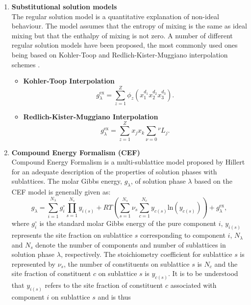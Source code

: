 	\begin{enumerate}
	\item \textbf{Substitutional solution models}\\
	The regular solution model is a quantitative explanation of non-ideal behaviour. The model assumes that the entropy of mixing is the same as ideal mixing but that the enthalpy of mixing is not zero. A number of different regular solution models have been proposed, the most commonly used ones being based on Kohler-Toop and Redlich-Kister-Muggiano interpolation schemes \cite{Lukas07}.
		\begin{itemize}
			\item \textbf{Kohler-Toop Interpolation}
			\begin{equation}
				g_{\lambda}^\text{ex} = \sum_{z=1}^Z \phi_z (x_1^{d_1} x_2^{d_2} x_3^{d_3} ).
			\end{equation}
			\item \textbf{Redlich-Kister-Muggiano Interpolation}
			\begin{equation}
				g_{\lambda}^\text{ex} = \sum_{z=1}^Z x_j x_k \sum_{\nu = 0} {^\nu}L_{j}.
			\end{equation}
			\end{itemize}
	\item \textbf{Compound Energy Formalism (CEF)} \\
	Compound Energy Formalism is a multi-sublattice model proposed by Hillert \cite{Hillert01} for an adequate description of the properties of solution phases with sublattices. The molar Gibbs energy, $g_{\lambda}$, of solution phase $\lambda$ based on the CEF model is generally given as:
	\begin{equation}\label{eq:g_lambda}
	g_{\lambda} = \sum_{i=1}^{N_{\lambda}} g_{i}^{\circ} \prod _{s=1}^{N_s} y_{i(s)} + RT\left( \sum_{s=1}^{N_s} \nu_s \sum_{c=1}^{N_c}   y_{c(s)} \mathrm{ln} (y_{c(s)}) \right) + g_{\lambda}^\text{ex},
	\end{equation}
	where $g_{i}^{\circ}$ is the standard molar Gibbs energy of the pure component $i$,
$y_{i(s)}$ represents the site fraction on sublattice $s$ corresponding to component $i$, $N_{\lambda}$ and
$N_s$ denote the number of components and number of sublattices in solution phase $\lambda$, respectively.
The stoichiometry coefficient for sublattice $s$ is represented by $\nu_s$, the number of constituents on sublattice $s$ is $N_c$
and the site fraction of constituent $c$ on sublattice $s$ is $y_{c(s)}$.  It is to be understood that $y_{i(s)}$
refers to the site fraction of  constituent $c$ associated with component $i$ on sublattice $s$ and is thus

\end{enumerate}
